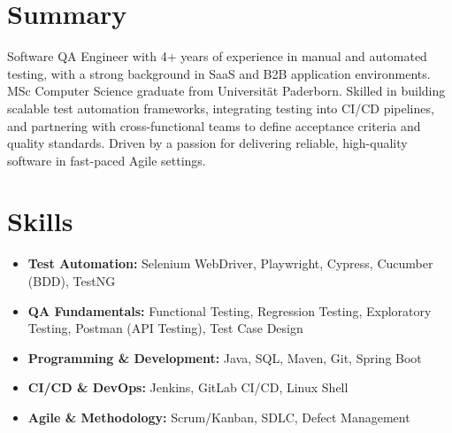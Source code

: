 \documentclass[10pt]{article}   %
\begin{document}
\begin{minipage}[t]{0.67\textwidth}
\vspace*{0pt}
\section*{Summary}
Software QA Engineer with 4+ years of experience in manual and automated testing, with a strong background in SaaS and B2B application environments. MSc Computer Science graduate from Universität Paderborn. Skilled in building scalable test automation frameworks, integrating testing into CI/CD pipelines, and partnering with cross-functional teams to define acceptance criteria and quality standards. Driven by a passion for delivering reliable, high-quality software in fast-paced Agile settings.\\




\section*{Skills}
\begin{itemize}
	\item \textbf{Test Automation:} Selenium WebDriver, Playwright, Cypress, Cucumber (BDD), TestNG
	\item \textbf{QA Fundamentals:} Functional Testing, Regression Testing, Exploratory Testing, Postman (API Testing), Test Case Design
	\item \textbf{Programming \& Development:} Java, SQL, Maven, Git, Spring Boot
	\item \textbf{CI/CD \& DevOps:} Jenkins, GitLab CI/CD, Linux Shell
	\item \textbf{Agile \& Methodology:} Scrum/Kanban, SDLC, Defect Management
\end{itemize}


\end{minipage}
\end{document}
